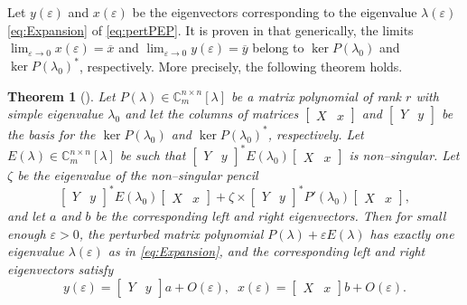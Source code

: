 \documentclass[12pt]{article}
\newtheorem{theorem}{Theorem}[section]
\begin{document}
Let $y(\varepsilon)$ and $x(\varepsilon)$ be the eigenvectors corresponding to the eigenvalue $\lambda(\varepsilon)$ \eqref{eq:Expansion} of \eqref{eq:pertPEP}. It is proven in \cite{de2010first} that generically, the limits $\lim_{\varepsilon\to 0}x(\varepsilon) = \overline{x}$ and $\lim_{\varepsilon\to 0}y(\varepsilon) = \overline{y}$ belong to $\ker P(\lambda_0)$ and $\ker P(\lambda_0)^*$, respectively. More precisely, the following theorem holds.
\begin{theorem} [\cite{de2010first}]
    Let $P(\lambda)\in\mathbb{C}^{n\times n}_m[\lambda]$ be a matrix polynomial of rank $r$ with simple eigenvalue $\lambda_0$ and let the columns of matrices $\begin{bmatrix}
    X & x
    \end{bmatrix}$ and $\begin{bmatrix}
    Y & y
    \end{bmatrix}$ be the basis for the $\ker P(\lambda_0)$ and $\ker P(\lambda_0)^*$, respectively. Let $E(\lambda)\in\mathbb{C}^{n\times n}_m[\lambda]$ be such that $\begin{bmatrix}
    Y & y
    \end{bmatrix}^*E(\lambda_0)\begin{bmatrix}
    X & x
    \end{bmatrix}$ is non--singular. Let $\zeta$ be the eigenvalue of the non--singular pencil
    \begin{equation}\label{pencilEvec}
        \begin{bmatrix}
    Y & y
    \end{bmatrix}^*E(\lambda_0)\begin{bmatrix}
    X & x
    \end{bmatrix} + \zeta \times \begin{bmatrix}
    Y & y
    \end{bmatrix}^*P'(\lambda_0)\begin{bmatrix}
    X & x
    \end{bmatrix},
    \end{equation}
    and let $a$ and $b$ be the corresponding left and right eigenvectors. Then for small enough $\varepsilon>0$, the perturbed matrix polynomial $P(\lambda)+\varepsilon E(\lambda)$ has exactly one eigenvalue $\lambda(\varepsilon)$ as in \eqref{eq:Expansion}, and the corresponding left and right eigenvectors satisfy
\[
        y(\varepsilon) = \begin{bmatrix}
    Y & y
    \end{bmatrix}a + O(\varepsilon),\;\; x(\varepsilon) = \begin{bmatrix}
    X & x
    \end{bmatrix}b + O(\varepsilon).
\]
\end{theorem}
\end{document}
